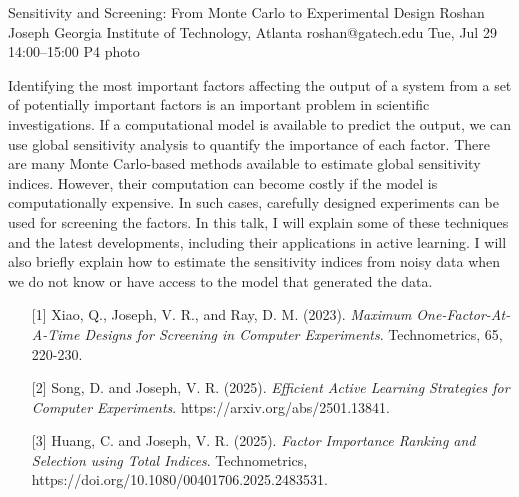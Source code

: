 \clearpage
\begin{talk}
  {Sensitivity and Screening: From Monte Carlo to Experimental Design}%
  {Roshan Joseph}%
  {Georgia Institute of Technology, Atlanta}%
  {roshan@gatech.edu}%
  {}%
  {}%
  {Tue, Jul 29 14:00–15:00}%
  {P4}%
  {photo}%
  
				
			
Identifying the most important factors affecting the output of a system from a set of potentially important factors is an important problem in scientific investigations. If a computational model is available to predict the output, we can use global sensitivity analysis to quantify the importance of each factor. There are many Monte Carlo-based methods available to estimate global sensitivity indices. However, their computation can become costly if the model is computationally expensive. In such cases, carefully designed experiments can be used for screening the factors. In this talk, I will explain some of these techniques and the latest developments, including their applications in active learning. I will also briefly explain how to estimate the sensitivity indices from noisy data when we do not know or have access to the model that generated the data.
\medskip

\begin{enumerate}
	\item[{[1]}] Xiao, Q., Joseph, V. R., and Ray, D. M. (2023). {\it Maximum One-Factor-At-A-Time  Designs for Screening in Computer Experiments}. Technometrics, 65, 220-230.
    \item[{[2]}] Song, D. and Joseph, V. R. (2025). {\it Efficient Active Learning Strategies for Computer Experiments}. https://arxiv.org/abs/2501.13841.
	\item[{[3]}] Huang, C. and Joseph, V. R. (2025). {\it Factor Importance Ranking and Selection using Total Indices}. Technometrics, https://doi.org/10.1080/00401706.2025.2483531.
\end{enumerate}

\end{talk}

